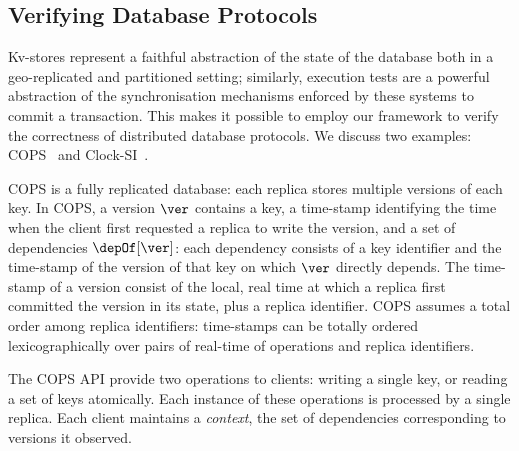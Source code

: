 \subsection{Verifying Database Protocols}
\label{sec:verify-impl}
Kv-stores represent a faithful abstraction of the state of the database both in a geo-replicated and 
partitioned setting; similarly, execution tests are a powerful abstraction of the synchronisation mechanisms 
enforced by these systems to commit a transaction. This makes it possible to employ our 
framework to verify the correctness of distributed database protocols. 
We discuss two examples:
COPS~\cite{cops} and Clock-SI~\cite{clocksi}.

COPS is a fully replicated database: each replica stores multiple versions of each key. 
In COPS, a version \( \ver \) contains a key, a time-stamp identifying the time when the 
client first requested a replica to write the version, and a set of dependencies $\depOf[\ver]$: 
each dependency consists of a key identifier and the time-stamp of the version of that key on which $\ver$ directly depends. 
The time-stamp of a version consist of the local, real time at which a replica first committed the version in its state, plus 
a replica identifier. COPS assumes a total order among replica identifiers: time-stamps can be totally 
ordered lexicographically over pairs of real-time of operations and replica identifiers.

The COPS API provide two operations to clients: writing a single key, or reading 
a set of keys atomically. Each instance of these operations is processed by a single replica. 
Each client maintains a \emph{context}, the set of dependencies corresponding to versions it observed.  

